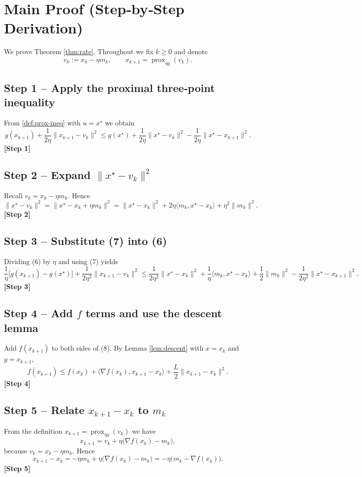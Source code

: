 \documentclass[12pt]{article}
\theoremstyle{definition}
\newcommand{\prox}{\operatorname{prox}}
\begin{document}
\section*{Main Proof (Step‑by‑Step Derivation)}
We prove Theorem \ref{thm:rate}. Throughout we fix $k\ge0$ and denote
\[
v_{k}:=x_{k}-\eta m_{k},\qquad
x_{k+1}= \prox_{\eta g}(v_{k}).
\]

\subsection*{Step 1 – Apply the proximal three‑point inequality}
From \eqref{def:prox-ineq} with $u=x^{\star}$ we obtain
\[
g(x_{k+1})+\frac{1}{2\eta}\|x_{k+1}-v_{k}\|^{2}
\le g(x^{\star})+\frac{1}{2\eta}\|x^{\star}-v_{k}\|^{2}
-\frac{1}{2\eta}\|x^{\star}-x_{k+1}\|^{2}.
\tag{6}
\]
\noindent\textbf{[Step 1]}

\subsection*{Step 2 – Expand $\|x^{\star}-v_{k}\|^{2}$}
Recall $v_{k}=x_{k}-\eta m_{k}$. Hence
\[
\|x^{\star}-v_{k}\|^{2}
=\|x^{\star}-x_{k}+\eta m_{k}\|^{2}
=\|x^{\star}-x_{k}\|^{2}+2\eta\langle m_{k},x^{\star}-x_{k}\rangle+\eta^{2}\|m_{k}\|^{2}.
\tag{7}
\]
\noindent\textbf{[Step 2]}

\subsection*{Step 3 – Substitute (7) into (6)}
Dividing (6) by $\eta$ and using (7) yields
\[
\frac{1}{\eta}\bigl[g(x_{k+1})-g(x^{\star})\bigr]
+\frac{1}{2\eta^{2}}\|x_{k+1}-v_{k}\|^{2}
\le
\frac{1}{2\eta^{2}}\|x^{\star}-x_{k}\|^{2}
+\frac{1}{\eta}\langle m_{k},x^{\star}-x_{k}\rangle
+\frac{1}{2}\|m_{k}\|^{2}
-\frac{1}{2\eta^{2}}\|x^{\star}-x_{k+1}\|^{2}.
\tag{8}
\]
\noindent\textbf{[Step 3]}

\subsection*{Step 4 – Add $f$ terms and use the descent lemma}
Add $f(x_{k+1})$ to both sides of (8). By Lemma \ref{lem:descent} with $x=x_{k}$ and $y=x_{k+1}$,
\[
f(x_{k+1})\le f(x_{k})+\langle\nabla f(x_{k}),x_{k+1}-x_{k}\rangle
+\frac{L}{2}\|x_{k+1}-x_{k}\|^{2}.
\tag{9}
\]
\noindent\textbf{[Step 4]}

\subsection*{Step 5 – Relate $x_{k+1}-x_{k}$ to $m_{k}$}
From the definition $x_{k+1}= \prox_{\eta g}(v_{k})$ we have
\[
x_{k+1}=v_{k}+ \eta\bigl(\nabla f(x_{k})-m_{k}\bigr),
\]
because $v_{k}=x_{k}-\eta m_{k}$. Hence
\[
x_{k+1}-x_{k}= -\eta m_{k}+\eta\bigl(\nabla f(x_{k})-m_{k}\bigr)
= -\eta\bigl(m_{k}-\nabla f(x_{k})\bigr).
\tag{10}
\]
\noindent\textbf{[Step 5]}
\end{document}
